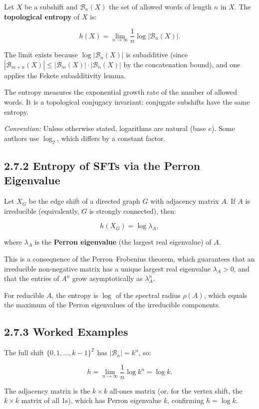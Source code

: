 \begin{definition}
Let $X$ be a subshift and $\mathcal{B}_n(X)$ the set of allowed words of length $n$ in $X$. The \textbf{topological entropy} of $X$ is:

\[h(X) = \lim_{n \to \infty} \frac{1}{n} \log |\mathcal{B}_n(X)|.\]

The limit exists because $\log |\mathcal{B}_n(X)|$ is subadditive (since $|\mathcal{B}_{m+n}(X)| \leq |\mathcal{B}_m(X)| \cdot |\mathcal{B}_n(X)|$ by the concatenation bound), and one applies the Fekete subadditivity lemma.

The entropy measures the exponential growth rate of the number of allowed words. It is a topological conjugacy invariant: conjugate subshifts have the same entropy.

\textit{Convention:} Unless otherwise stated, logarithms are natural (base $e$). Some authors use $\log_2$, which differs by a constant factor.
\end{definition}

\subsection{2.7.2 Entropy of SFTs via the Perron Eigenvalue}

\begin{theorem}
Let $X_G$ be the edge shift of a directed graph $G$ with adjacency matrix $A$. If $A$ is irreducible (equivalently, $G$ is strongly connected), then:

\[h(X_G) = \log \lambda_A,\]

where $\lambda_A$ is the \textbf{Perron eigenvalue} (the largest real eigenvalue) of $A$.

This is a consequence of the Perron--Frobenius theorem, which guarantees that an irreducible non-negative matrix has a unique largest real eigenvalue $\lambda_A > 0$, and that the entries of $A^n$ grow asymptotically as $\lambda_A^n$.

For reducible $A$, the entropy is $\log$ of the spectral radius $\rho(A)$, which equals the maximum of the Perron eigenvalues of the irreducible components.
\end{theorem}

\subsection{2.7.3 Worked Examples}

\begin{example}
The full shift $\{ 0, 1, \ldots, k-1\} ^{\mathbb{Z}}$ has $|\mathcal{B}_n| = k^n$, so:

\[h = \lim_{n \to \infty} \frac{1}{n} \log k^n = \log k.\]

The adjacency matrix is the $k \times k$ all-ones matrix (or, for the vertex shift, the $k \times k$ matrix of all 1s), which has Perron eigenvalue $k$, confirming $h = \log k$.
\end{example}


